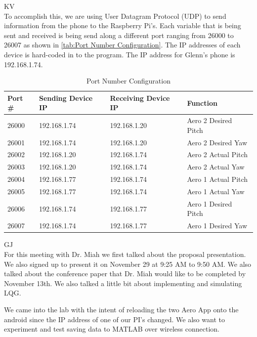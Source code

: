 \documentclass[fontsize=11pt, %
                             paper=letter, %
                             openany, %
                             captions=tableheading,
                             index=totoc,
                             hyperref]{labbook}
\begin{document}
\begin{addmargin}[0cm]{0cm}
KV\\
To accomplish this, we are using User Datagram Protocol (UDP) to send information from the phone to the Raspberry Pi's.  Each variable that is being sent and received is being send along a different port ranging from 26000 to 26007 as shown in \autoref{tab:Port Number Configuration}.  The IP addresses of each device is hard-coded in to the program.  The IP address for Glenn's phone is 192.168.1.74.

\begin{table}
    \centering
    \begin{tabular}{l|l|l|l}
        \toprule
        \textbf{Port \#} & \textbf{Sending Device IP} & \textbf{Receiving Device IP} & \textbf{Function}\\
        \toprule
        26000 & 192.168.1.74 & 192.168.1.20 & Aero 2 Desired Pitch\\
        26001 & 192.168.1.74 & 192.168.1.20 & Aero 2 Desired Yaw\\
        26002 & 192.168.1.20 & 192.168.1.74 & Aero 2 Actual Pitch\\
        26003 & 192.168.1.20 & 192.168.1.74 & Aero 2 Actual Yaw\\
        26004 & 192.168.1.77 & 192.168.1.74 & Aero 1 Actual Pitch\\
        26005 & 192.168.1.77 & 192.168.1.74 & Aero 1 Actual Yaw\\
        26006 & 192.168.1.74 & 192.168.1.77 & Aero 1 Desired Pitch\\
        26007 & 192.168.1.74 & 192.168.1.77 & Aero 1 Desired Yaw\\
        \bottomrule
    \end{tabular}
    \caption{Port Number Configuration}
    \label{tab:Port Number Configuration}
\end{table}

GJ\\
For this meeting with Dr. Miah we first talked about the proposal presentation.  We also signed up to present it on November 29 at 9:25 AM to 9:50 AM.  We also talked about the conference paper that Dr. Miah would like to be completed by November 13th.  We also talked a little bit about implementing and simulating LQG.






We came into the lab with the intent of reloading the two Aero App onto the android since the IP address of one of our PI's changed.  We also want to experiment and test saving data to MATLAB over wireless connection.  


\end{addmargin}
\end{document}
